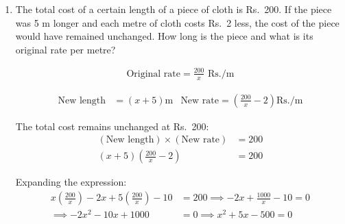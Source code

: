 \begin{enumerate}[label=\thesubsection.\arabic*, ref=\thesubsection.\theenumi]
	Solving for the state coordinates:
	\begin{align*}
		\begin{bmatrix} x \\ h \end{bmatrix} &= \frac{1}{4} \begin{bmatrix} \sqrt{3} & 1 \\ -1 & \sqrt{3} \end{bmatrix} \begin{bmatrix} 0 \\ 80 \end{bmatrix} 
		= \frac{1}{4} \begin{bmatrix} 80 \\ 80\sqrt{3} \end{bmatrix}
		= \begin{bmatrix} 20 \\ 20\sqrt{3} \end{bmatrix}
	\end{align*}
	
	Thus, $x = 20\text{ m}$ and $h = 20\sqrt{3}\text{ m}$.
	
	
	\item The total cost of a certain length of a piece of
	cloth is Rs.\ 200. If the piece was 5 m longer and each metre
	of cloth costs Rs.\ 2 less, the cost of the piece would have
	remained unchanged. How long is the piece and what is its
	original rate per metre?
	
	\solution
	
	\begin{align*}
		\text{Original rate} = \frac{200}{x}\text{ Rs./m}
	\end{align*}
	
	\begin{align*}
		\text{New length} &= (x + 5)\text{m} & \text{New rate} = \left(\frac{200}{x} - 2\right)\text{Rs./m}
	\end{align*}
	
	The total cost remains unchanged at Rs.\ 200:
	\begin{align*}
		(\text{New length}) \times (\text{New rate}) &= 200 \\
		(x + 5)\left(\frac{200}{x} - 2\right) &= 200
	\end{align*}
	
	Expanding the expression:
	\begin{align*}
		x\left(\frac{200}{x}\right) - 2x + 5\left(\frac{200}{x}\right) - 10 &= 200 \implies
		-2x + \frac{1000}{x} - 10 = 0\\
	 \implies -2x^2 - 10x + 1000 &= 0 \implies	x^2 + 5x - 500 = 0
	\end{align*}
	

\end{enumerate}
